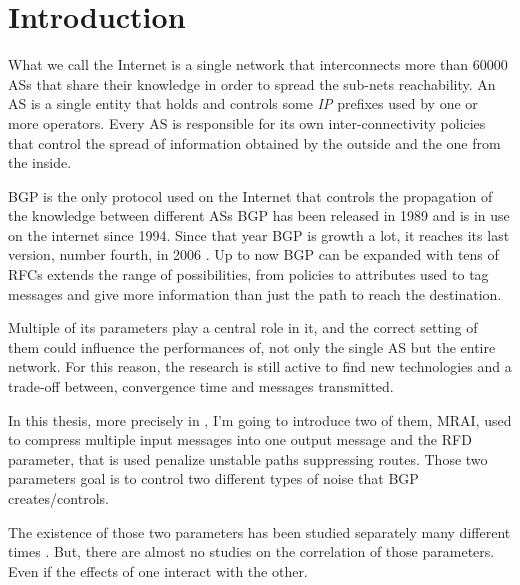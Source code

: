 \chapter{Introduction}
\label{cha:introduction}



What we call the Internet is a single network that interconnects more than \num{60000}
\acp{AS} that share their knowledge in order to spread the sub-nets reachability.
An \ac{AS} is a single entity that holds and controls some \textit{IP} prefixes
used by one or more operators.
Every \ac{AS} is responsible for its own inter-connectivity policies that control
the spread of information obtained by the outside and the one from the inside.

\ac{BGP} is the only protocol used on the Internet that controls the propagation 
of the knowledge between different \acp{AS}
\ac{BGP} has been released in \num{1989} and is in use on the internet since 
\num{1994}.
Since that year \ac{BGP} is growth a lot, it reaches its last version, number
fourth, in \num{2006} \cite{rfc4271}.
Up to now \ac{BGP} can be expanded with tens of \acp{RFC} extends the range of possibilities,
from policies to attributes used to tag messages and give more information than
just the path to reach the destination.

Multiple of its parameters play a central role in it, and the correct setting
of them could influence the performances of, not only the single \ac{AS} but
the entire network.
For this reason, the research is still active to find new technologies and
a trade-off between, convergence time and messages transmitted.

In this thesis, more precisely in , I'm going to introduce
two of them, \ac{MRAI}, used to compress multiple input messages into one 
output message and the \ac{RFD} parameter, that is used penalize unstable paths
suppressing routes.
Those two parameters goal is to control two different types of noise that 
\ac{BGP} creates/controls.

The existence of those two parameters has been studied separately many different
times \cite{fabrikant2011there,daggitt2018rate,qiu2005optimal,gray2020bgp}.
But, there are almost no studies on the correlation of those parameters.
Even if the effects of one interact with the other.

